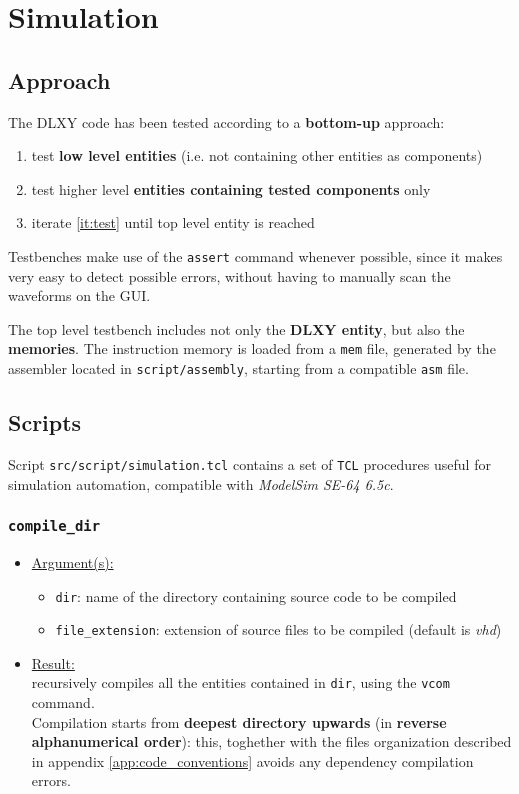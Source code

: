 \chapter{Simulation}
\label{chap:simulation}

\section{Approach}
The DLXY code has been tested according to a \textbf{bottom-up} approach:
\begin{enumerate}
	\item test \textbf{low level entities} (i.e. not containing other
		entities as components)
	\item \label{it:test} test higher level \textbf{entities containing
		tested components} only
	\item iterate \ref{it:test} until top level entity is reached
\end{enumerate}

Testbenches make use of the \texttt{assert} command whenever possible, since
it makes very easy to detect possible errors, without having to manually scan
the waveforms on the GUI.

\bigskip
The top level testbench includes not only the \textbf{DLXY entity}, but also the
\textbf{memories}. The instruction memory is loaded from a \texttt{mem} file,
generated by the assembler located in \texttt{script/assembly}, starting from
a compatible \texttt{asm} file.

\section{Scripts}
Script \texttt{src/script/simulation.tcl} contains a set of \texttt{TCL}
procedures useful for simulation automation, compatible with
\textit{ModelSim SE-64 6.5c}.
\subsection{\texttt{compile\_dir}}
\begin{itemize}
	\item \underline{Argument(s):}
		\begin{itemize}
			\item \texttt{dir}: name of the directory containing
				source code to be compiled
			\item \texttt{file\_extension}: extension of source files
				to be compiled (default is \textit{vhd})
		\end{itemize}
	\item \underline{Result:} \\
		recursively compiles all the entities contained in \texttt{dir},
		using the \texttt{vcom} command. \\
		Compilation starts from \textbf{deepest directory upwards} (in
		\textbf{reverse alphanumerical order}): this, toghether with the
		files organization described in appendix
		\ref{app:code_conventions} avoids any dependency compilation errors.
\end{itemize}

